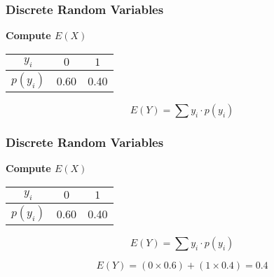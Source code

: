 \documentclass{beamer}
\begin{document}
\begin{frame}
\frametitle{Discrete Random Variables}
\Large
\vspace{-1.5cm}
\textbf{Compute $E(X)$}
\begin{center}
\begin{tabular}{|c|c|c|}
\hline $y_i$ & $0$ & $1$  \\ 
\hline $p(y_i)$& 0.60 & 0.40 \\
\hline 
\end{tabular} 
\end{center}

\[ E(Y) =  \sum  y_i \cdot p(y_i)   \]


\end{frame}

\begin{frame}
\frametitle{Discrete Random Variables}
\Large
\vspace{-1.5cm}
\textbf{Compute $E(X)$}
\begin{center}
\begin{tabular}{|c|c|c|}
\hline $y_i$ & $0$ & $1$  \\ 
\hline $p(y_i)$& 0.60 & 0.40 \\
\hline 
\end{tabular} 
\end{center}

\[ E(Y) =  \sum  y_i \cdot p(y_i)   \]

\[ E(Y) = (0 \times 0.6) +  (1 \times 0.4)  =0.4 \]

\end{frame}
\end{document}
